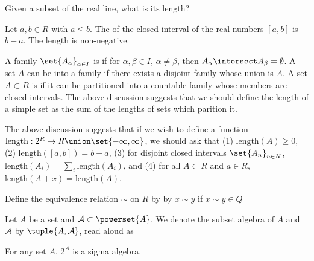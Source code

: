
\sbasic
















\sstart
{}


Given a subset of the real
line, what is its length?


Let $a, b \in R$ with $a \leq b$.
The 
of the closed interval
of the real numbers
$[a, b]$ is $b - a$.
The length is non-negative.

A family
$\set{A_{\alpha}}_{\alpha \in I}$
is
if for $\alpha, \beta \in I$,
$\alpha \neq \beta$, then
$A_\alpha \intersect A_\beta = \emptyset$.
A set $A$ can be
into a family
if there exists a disjoint
family whose union is $A$.
A set $A \subset R$ is
 if
it can be partitioned
into a countable family
whose members are closed intervals.
The above discussion suggests that
we should define the length of a
simple set as the sum of the lengths
of sets which parition it.

The above discussion suggests that
if we wish to define a function
$\text{length}: 2^{R} \to R \union \set{-\infty, \infty}$,
we should ask that
(1) $\text{length}(A) \geq 0$,
(2) $\text{length}([a, b]) = b-a$,
(3) for disjoint closed intervals
$\set{A_n}_{n \in N}$,
$\text{length}(A_i) = \sum_i \text{length}(A_i)$,
and
(4) for all $A \subset R$ and $a \in R$,
$\text{length}(A+x) = \text{length}(A)$.


Define the equivalence relation
$\sim$ on $R$ by
by $x \sim y$ if $x \sim y \in Q$


Let $A$ be a set and $\mathcal{A} \subset \powerset{A}$.
We denote the subset algebra of $A$ and $\mathcal{A}$
by $\tuple{A, \mathcal{A}}$, read aloud as 


\begin{prop}
  For any set $A$, $2^{A}$ is a sigma algebra.
\end{prop}

